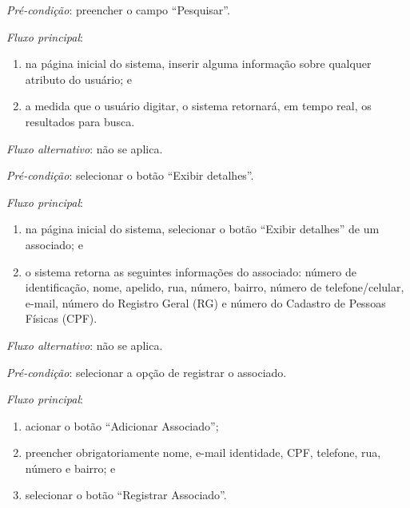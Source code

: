 \documentclass[a4paper,12pt]{article}
\begin{document}
\vspace{0.7cm}

\noindent \textit{Pré-condição}: preencher o campo ``Pesquisar''.

\noindent \textit{Fluxo principal}:

\begin{enumerate}
    \item na página inicial do sistema, inserir alguma informação sobre qualquer atributo do usuário; e
    \item a medida que o usuário digitar, o sistema retornará, em tempo real, os resultados para busca.
\end{enumerate}

\noindent \textit{Fluxo alternativo}: não se aplica.


\vspace{0.7cm}

\noindent \textit{Pré-condição}: selecionar o botão ``Exibir detalhes''.

\noindent \textit{Fluxo principal}:

\begin{enumerate}
    \item na página inicial do sistema, selecionar o botão ``Exibir detalhes'' de um associado; e
    \item o sistema retorna as seguintes informações do associado: número de identificação, nome, apelido, rua, número, bairro, número de telefone/celular, e-mail, número do Registro Geral (RG) e número do Cadastro de Pessoas Físicas (CPF).
\end{enumerate}

\noindent \textit{Fluxo alternativo}: não se aplica.


\vspace{0.7cm}

\noindent \textit{Pré-condição}: selecionar a opção de registrar o associado.

\noindent \textit{Fluxo principal}:

\begin{enumerate}
    \item acionar o botão ``Adicionar Associado'';
    \item preencher obrigatoriamente nome, e-mail identidade, CPF, telefone, rua, número e bairro; e
    \item selecionar o botão ``Registrar Associado''.
\end{enumerate}
\end{document}
